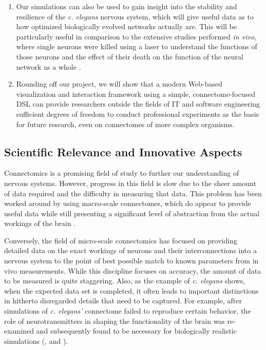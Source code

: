 \documentclass[a4paper,11pt]{article}
\begin{document}
\begin{enumerate}
\item Our simulations can also be used to gain insight into the stability and resilience of the \emph{c. elegans} nervous system, which will give useful data as to how optimized biologically evolved networks actually are. This will be particularly useful in comparison to the extensive studies performed \emph{in vivo}, where single neurons were killed using a laser to understand the functions of those neurons and the effect of their death on the function of the neural network as a whole \citep{rothman2012caenorhabditis}.
\item Rounding off our project, we will show that a modern Web-based visualization and interaction framework using a simple, connectome-focused DSL can provide researchers outside the fields of IT and software engineering sufficient degrees of freedom to conduct professional experiments as the basis for future research, even on connectomes of more complex organisms.
\end{enumerate}


\subsection{Scientific Relevance and Innovative Aspects}
Connectomics is a promising field of study to further our understanding of nervous systems. However, progress in this field is slow due to the sheer amount of data required and the difficulty in measuring that data. This problem has been worked around by using macro-scale connectomes, which do appear to provide useful data while still presenting a significant level of abstraction from the actual workings of the brain \citep{TheMissingArticle}.

Conversely, the field of micro-scale connectomics has focused on providing detailed data on the exact workings of neurons and their interconnections into a nervous system to the point of best possible match to known parameters from in vivo measurements. While this discipline focuses on accuracy, the amount of data to be measured is quite staggering. Also, as the example of \emph{c. elegans} shows, when the expected data set is completed, it often leads to important distinctions in hitherto disregarded details that need to be captured. For example, after simulations of \emph{c. elegans'} connectome failed to reproduce certain behavior, the role of neurotransmitters in shaping the functionality of the brain was re-examined and subsequently found to be necessary for biologically realistic simulations (\citep{Bargmann2012}, \citep{Izquierdo2013} and \citep{Ogg1997}).
\end{document}
